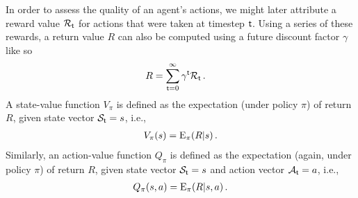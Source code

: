 In order to assess the quality of an agent's actions, we might later attribute a reward value ${\cal R}_{{\sf t}}$ for actions that were taken at timestep ${\sf t}$. Using a series of these rewards, a return value $R$ can also be computed using a future discount factor $\gamma$ like so 
\begin{align}
R &= \sum_{{\sf t}=0}^\infty \gamma^{\sf t}{\cal R}_{\sf t} \,.
\end{align}
A state-value function $V_\pi$ is defined as the expectation (under policy $\pi$) of return $R$, given state vector ${\cal S}_{\sf t}=s$, i.e.,
\begin{align}
V_\pi (s) = {\rm E}_\pi (R\vert s) \,.
\end{align}
Similarly, an action-value function $Q_\pi$ is defined as the expectation (again, under policy $\pi$) of return $R$, given state vector ${\cal S}_{\sf t}=s$ and action vector ${\cal A}_{\sf t}=a$, i.e.,
\begin{align}
Q_\pi (s,a) = {\rm E}_\pi (R\vert s,a) \,.
\end{align}
